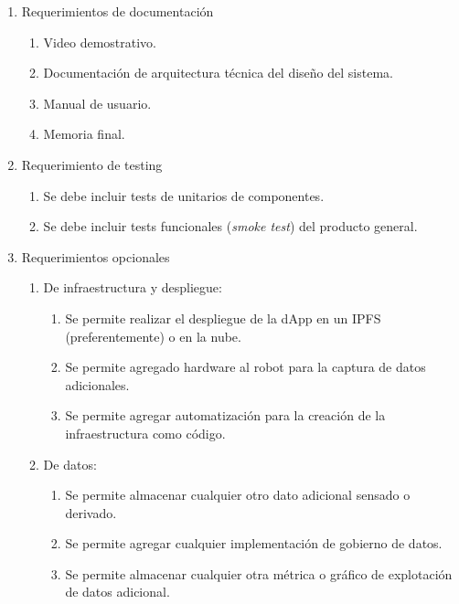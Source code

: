 \begin{enumerate}
	\item Requerimientos de documentación		
		\begin{enumerate}			
			\item Video demostrativo.	
			\item Documentación de arquitectura técnica del diseño del sistema.			
			\item Manual de usuario.	
			\item Memoria final.	
		\end{enumerate}	
		

		
		
	\item Requerimiento de testing		
		\begin{enumerate}			
			\item Se debe incluir tests de unitarios de componentes.
			\item Se debe incluir tests funcionales (\textit{smoke test}) del producto general.		
		\end{enumerate}	
	
	\item Requerimientos opcionales		
		\begin{enumerate}			
			\item De infraestructura y despliegue:
				\begin{enumerate}			
					\item Se permite realizar el despliegue de la dApp en un IPFS (preferentemente) o en la nube.					
					\item Se permite agregado hardware al robot para la captura de datos adicionales.
					\item Se permite agregar automatización para la creación de la infraestructura como código.
				\end{enumerate}			
			
			\item De datos:
				\begin{enumerate}			
					\item Se permite almacenar cualquier otro dato adicional sensado o derivado.
					\item Se permite agregar cualquier implementación de gobierno de datos.	
					\item Se permite almacenar cualquier otra métrica o gráfico de explotación de datos adicional.
				\end{enumerate}
		
	\end{enumerate}
\end{enumerate}